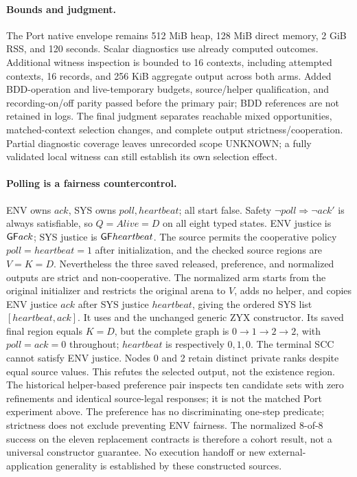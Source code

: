 \paragraph{Bounds and judgment.}
The Port native envelope remains 512 MiB heap, 128 MiB direct memory,
2 GiB RSS, and 120 seconds. Scalar diagnostics use already computed
outcomes. Additional witness inspection is bounded to 16 contexts,
including attempted contexts, 16 records, and 256 KiB aggregate output
across both arms. Added BDD-operation and live-temporary budgets,
source/helper qualification, and recording-on/off parity passed before
the primary pair; BDD references are not retained in logs. The final judgment
separates reachable mixed opportunities, matched-context selection
changes, and complete output strictness/cooperation. Partial diagnostic
coverage leaves unrecorded scope UNKNOWN; a fully validated local
witness can still establish its own selection effect.


\paragraph{Polling is a fairness countercontrol.}
ENV owns $ack$, SYS owns $poll,heartbeat$; all start false.
Safety $\neg poll\Rightarrow\neg ack'$ is always satisfiable, so
$Q=Alive=D$ on all eight typed states. ENV justice is $\mathsf{G}\mathsf{F} ack$;
SYS justice is $\mathsf{G}\mathsf{F} heartbeat$. The source permits the cooperative
policy $poll=heartbeat=1$ after initialization, and the checked source
regions are $V=K=D$. Nevertheless the three saved released, preference,
and normalized outputs are strict and non-cooperative.
The normalized arm starts from the original initializer and restricts
the original arena to $V$, adds no helper, and copies ENV justice $ack$
after SYS justice $heartbeat$, giving the ordered SYS list
$[heartbeat,ack]$. It uses  and the unchanged
generic ZYX constructor. Its saved final region equals $K=D$, but the
complete graph is $0\to1\to2\to2$, with $poll=ack=0$ throughout;
$heartbeat$ is respectively $0,1,0$. The terminal SCC cannot satisfy
ENV justice. Nodes 0 and 2 retain distinct private ranks despite equal
source values. This refutes the selected output, not the existence region.
The historical helper-based preference pair inspects ten candidate sets
with zero refinements and identical source-legal responses; it is not
the matched Port experiment above. The preference
has no discriminating one-step predicate; strictness does not exclude
preventing ENV fairness. The normalized 8-of-8 success on the eleven
replacement contracts is therefore a cohort result, not a universal
constructor guarantee. No execution handoff or new external-application
generality is established by these constructed sources.
